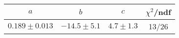 \begin{tabular}{c|c|c|c}
$a$ & $b$ & $c$ & $\chi^2$/ndf \\
\hline
$0.189\pm0.013$ & $-14.5\pm5.1$ & $4.7\pm1.3$ & 13/26
\end{tabular}
